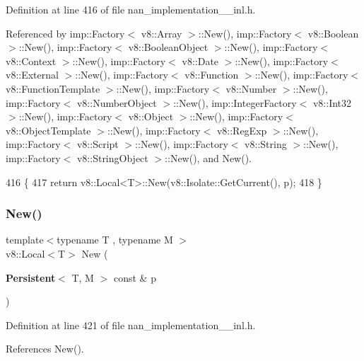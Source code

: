 Definition at line 416 of file nan\+\_\+implementation\+\_\+\_\+inl.\+h.



Referenced by imp\+::\+Factory$<$ v8\+::\+Array $>$\+::\+New(), imp\+::\+Factory$<$ v8\+::\+Boolean $>$\+::\+New(), imp\+::\+Factory$<$ v8\+::\+Boolean\+Object $>$\+::\+New(), imp\+::\+Factory$<$ v8\+::\+Context $>$\+::\+New(), imp\+::\+Factory$<$ v8\+::\+Date $>$\+::\+New(), imp\+::\+Factory$<$ v8\+::\+External $>$\+::\+New(), imp\+::\+Factory$<$ v8\+::\+Function $>$\+::\+New(), imp\+::\+Factory$<$ v8\+::\+Function\+Template $>$\+::\+New(), imp\+::\+Factory$<$ v8\+::\+Number $>$\+::\+New(), imp\+::\+Factory$<$ v8\+::\+Number\+Object $>$\+::\+New(), imp\+::\+Integer\+Factory$<$ v8\+::\+Int32 $>$\+::\+New(), imp\+::\+Factory$<$ v8\+::\+Object $>$\+::\+New(), imp\+::\+Factory$<$ v8\+::\+Object\+Template $>$\+::\+New(), imp\+::\+Factory$<$ v8\+::\+Reg\+Exp $>$\+::\+New(), imp\+::\+Factory$<$ v8\+::\+Script $>$\+::\+New(), imp\+::\+Factory$<$ v8\+::\+String $>$\+::\+New(), imp\+::\+Factory$<$ v8\+::\+String\+Object $>$\+::\+New(), and New().


\begin{DoxyCode}
416                                                    \{
417   \textcolor{keywordflow}{return} v8::Local<T>::New(v8::Isolate::GetCurrent(), p);
418 \}
\end{DoxyCode}
\mbox{\label{nan__implementation__12__inl_8h_a4c6a402f49f0cb9574fa28e93691c423}} 
\subsubsection{New()\hspace{0.1cm}{\footnotesize\ttfamily [2/3]}}
{\footnotesize\ttfamily template$<$typename T , typename M $>$ \\
v8\+::\+Local$<$T$>$ New (\begin{DoxyParamCaption}\item[{\textbf{ Persistent}$<$ T, M $>$ const \&}]{p }\end{DoxyParamCaption})}



Definition at line 421 of file nan\+\_\+implementation\+\_\+\_\+inl.\+h.



References New().


